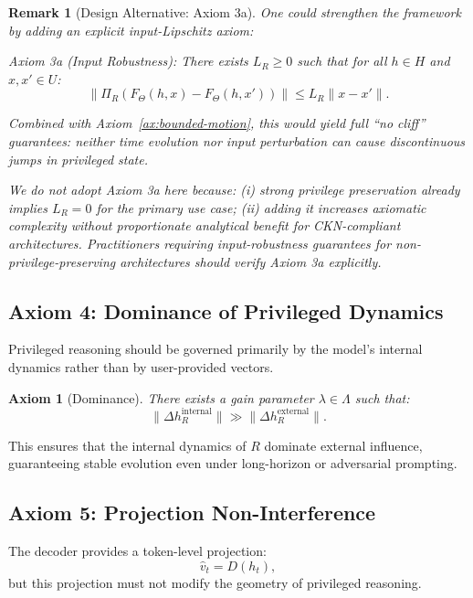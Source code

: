 \documentclass[11pt,a4paper]{article}
\newtheorem{axiom}{Axiom}
\newtheorem*{remark}{Remark}
\begin{document}
\begin{remark}[Design Alternative: Axiom 3a]
\label{rem:axiom-3a}
One could strengthen the framework by adding an explicit input-Lipschitz axiom:

\emph{Axiom 3a (Input Robustness):} There exists $L_R \geq 0$ such that for all $h \in H$ and $x, x' \in U$:
\[
\|\Pi_R(F_\Theta(h, x) - F_\Theta(h, x'))\| \leq L_R \|x - x'\|.
\]

Combined with Axiom~\ref{ax:bounded-motion}, this would yield full ``no cliff'' guarantees: neither time evolution nor input perturbation can cause discontinuous jumps in privileged state.

We do not adopt Axiom 3a here because: (i) strong privilege preservation already implies $L_R = 0$ for the primary use case; (ii) adding it increases axiomatic complexity without proportionate analytical benefit for CKN-compliant architectures. Practitioners requiring input-robustness guarantees for non-privilege-preserving architectures should verify Axiom 3a explicitly.
\end{remark}

\subsection{Axiom 4: Dominance of Privileged Dynamics}

Privileged reasoning should be governed primarily by the model's internal dynamics rather than by user-provided vectors.

\begin{axiom}[Dominance]
There exists a gain parameter $\lambda \in \Lambda$ such that:
\begin{equation}
\|\Delta h_R^{\text{internal}}\| \gg \|\Delta h_R^{\text{external}}\|.
\end{equation}
\end{axiom}

This ensures that the internal dynamics of $R$ dominate external influence, guaranteeing stable evolution even under long-horizon or adversarial prompting.

\subsection{Axiom 5: Projection Non-Interference}

The decoder provides a token-level projection:
\[
\hat{v}_t = D(h_t),
\]
but this projection must not modify the geometry of privileged reasoning.
\end{document}
